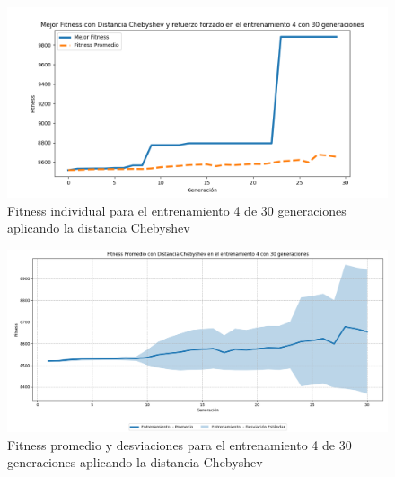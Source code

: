\documentclass[conference]{IEEEtran}
\begin{document}
\begin{figure}[H]
    \centering
    \includegraphics[width=0.9 \linewidth]{Chebyshev/Fitness_individual_30Gen/Fitness_4_Cheby_30Gen.png}
    \caption{Fitness individual para el entrenamiento 4 de 30 generaciones aplicando la distancia Chebyshev}
    \label{fig:cheb_4_30}
\end{figure}
\begin{figure}[H]
    \centering
    \includegraphics[width=0.9 \linewidth]{Chebyshev/Fitness_individual_30Gen/Fitness_4_Cheby_30Gen_Sombra.png}
    \caption{Fitness promedio y desviaciones para el entrenamiento 4 de 30 generaciones aplicando la distancia Chebyshev}
    \label{fig:cheb_4_30_sombra}
\end{figure}
\end{document}
